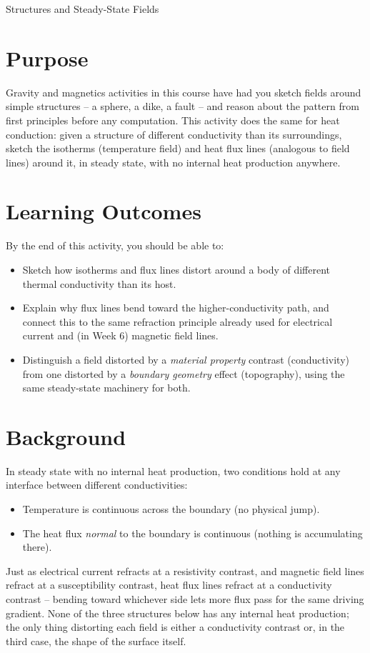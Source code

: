 \begin{activity}{Structures and Steady-State Fields}

\section*{Purpose}
Gravity and magnetics activities in this course have had you sketch fields around simple structures -- a sphere, a dike, a fault -- and reason about the pattern from first principles before any computation. This activity does the same for heat conduction: given a structure of different conductivity than its surroundings, sketch the isotherms (temperature field) and heat flux lines (analogous to field lines) around it, in steady state, with no internal heat production anywhere.

\section*{Learning Outcomes}
By the end of this activity, you should be able to:
\begin{itemize}
  \item Sketch how isotherms and flux lines distort around a body of different thermal conductivity than its host.
  \item Explain why flux lines bend toward the higher-conductivity path, and connect this to the same refraction principle already used for electrical current and (in Week 6) magnetic field lines.
  \item Distinguish a field distorted by a \emph{material property} contrast (conductivity) from one distorted by a \emph{boundary geometry} effect (topography), using the same steady-state machinery for both.
\end{itemize}

\section*{Background}
In steady state with no internal heat production, two conditions hold at any interface between different conductivities:
\begin{itemize}
  \item Temperature is continuous across the boundary (no physical jump).
  \item The heat flux \emph{normal} to the boundary is continuous (nothing is accumulating there).
\end{itemize}
Just as electrical current refracts at a resistivity contrast, and magnetic field lines refract at a susceptibility contrast, heat flux lines refract at a conductivity contrast -- bending toward whichever side lets more flux pass for the same driving gradient. None of the three structures below has any internal heat production; the only thing distorting each field is either a conductivity contrast or, in the third case, the shape of the surface itself.


\end{activity}
